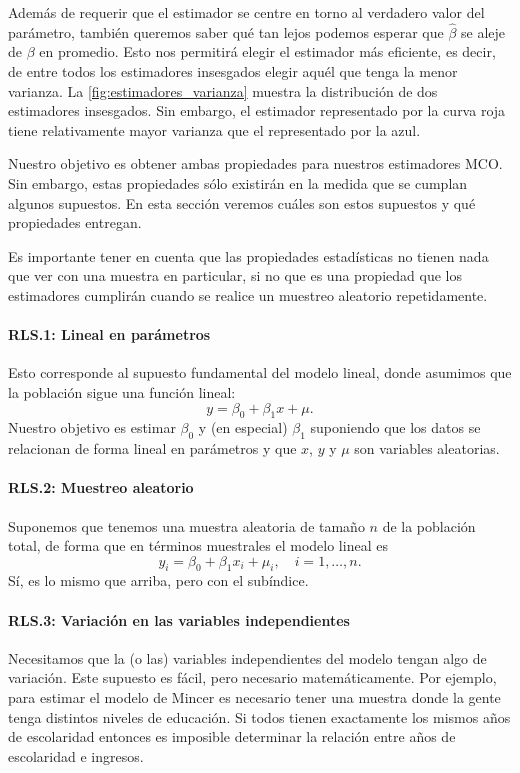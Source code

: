 \documentclass{report}\usepackage[]{graphicx}\usepackage[]{color}
\begin{document}
Además de requerir que el estimador se centre en torno al verdadero valor del parámetro, también queremos saber qué tan lejos podemos esperar que $\hat\beta$ se aleje de $\beta$ en promedio. Esto nos permitirá elegir el estimador más eficiente, es decir, de entre todos los estimadores insesgados elegir aquél que tenga la menor varianza.
La \autoref{fig:estimadores_varianza} muestra la distribución de dos estimadores insesgados. Sin embargo, el estimador representado por la curva roja tiene relativamente mayor varianza que el representado por la azul.

Nuestro objetivo es obtener ambas propiedades para nuestros estimadores MCO.
Sin embargo, estas propiedades sólo existirán en la medida que se cumplan algunos supuestos. En esta sección veremos cuáles son estos supuestos y qué propiedades entregan.

Es importante tener en cuenta que las propiedades estadísticas no tienen nada que ver con una muestra en particular, si no que es una propiedad que los estimadores cumplirán cuando se realice un muestreo aleatorio repetidamente.


\paragraph{RLS.1: Lineal en parámetros} Esto corresponde al supuesto fundamental del modelo lineal, donde asumimos que la población sigue una función lineal:
\begin{equation}
y = \beta_0 + \beta_1 x + \mu.
\end{equation}
Nuestro objetivo es estimar $\beta_0$ y (en especial) $\beta_1$ suponiendo que los datos se relacionan de forma lineal en parámetros y que $x$, $y$ y $\mu$ son variables aleatorias.

\paragraph{RLS.2: Muestreo aleatorio} Suponemos que tenemos una muestra aleatoria de tamaño $n$ de la población total, de forma que en términos muestrales el modelo lineal es
\begin{equation}
y_i = \beta_0 + \beta_1 x_i + \mu_i, \quad i = 1,\ldots,n.
\end{equation}
Sí, es lo mismo que arriba, pero con el subíndice.

\paragraph{RLS.3: Variación en las variables independientes}
Necesitamos que la (o las) variables independientes del modelo tengan algo de variación.
Este supuesto es fácil, pero necesario matemáticamente.
Por ejemplo, para estimar el modelo de Mincer es necesario tener una muestra donde la gente tenga distintos niveles de educación. Si todos tienen exactamente los mismos años de escolaridad entonces es imposible determinar la relación entre años de escolaridad e ingresos.
\end{document}
